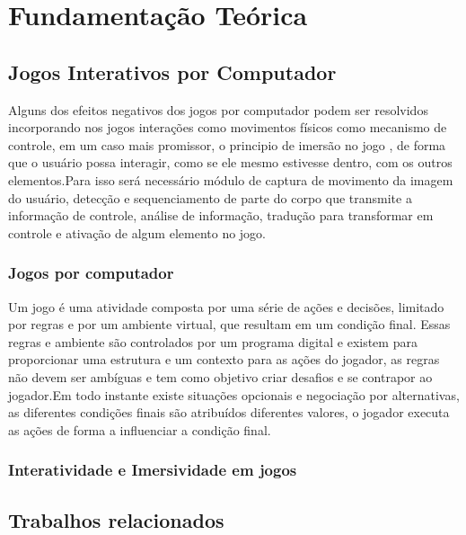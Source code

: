 \chapter{Fundamentação Teórica}

\section{Jogos Interativos por Computador}

Alguns dos efeitos negativos dos jogos por computador podem ser resolvidos
incorporando nos jogos interações como movimentos físicos como mecanismo de
controle, em um caso mais promissor, o principio de imersão no jogo , de forma que
 o usuário possa interagir, como se ele mesmo estivesse dentro, com os outros
 elementos.Para isso será necessário módulo de captura de movimento da imagem do
 usuário, detecção e sequenciamento de parte do corpo que transmite a informação
 de controle, análise de informação, tradução para transformar em controle e
 ativação de algum elemento no jogo.

\subsection{Jogos por computador}

Um jogo é uma atividade composta por uma série de ações e decisões, limitado por
regras e por um ambiente virtual, que resultam em um condição final.
Essas regras e ambiente são controlados por um programa digital e existem para
proporcionar uma estrutura e um contexto para as ações do jogador, as regras
não devem ser ambíguas e tem como objetivo criar desafios e se contrapor ao
jogador.Em todo instante existe situações opcionais e negociação por
alternativas, as diferentes condições finais são atribuídos diferentes valores,
o jogador executa as ações de forma a influenciar a condição final.\cite{DesignGames}

\subsection{Interatividade e Imersividade em jogos}

\section{Trabalhos relacionados}

